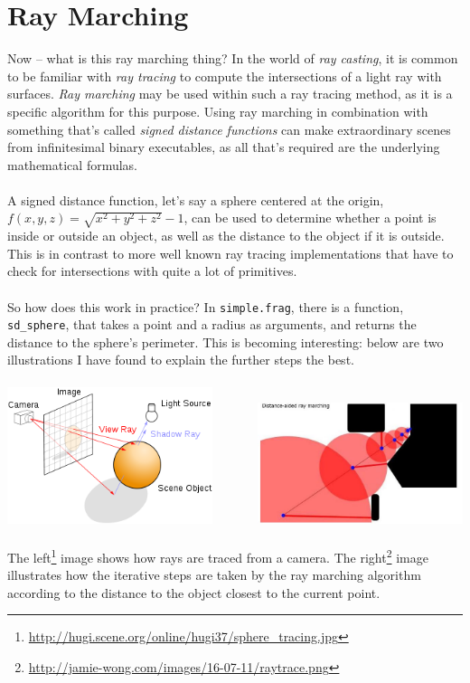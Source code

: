 \documentclass[abstract=off,oneside]{scrreprt}
\begin{document}
\section*{Ray Marching}
\label{sec-3}
Now -- what is this ray marching thing? In the world of \emph{ray casting},
it is common to be familiar with \emph{ray tracing} to compute the
intersections of a light ray with surfaces. \emph{Ray marching} may be used
within such a ray tracing method, as it is a specific algorithm for
this purpose. Using ray marching in combination with something that's
called \emph{signed distance functions} can make extraordinary scenes from
infinitesimal binary executables, as all that's required are the
underlying mathematical formulas.
\\\\
A signed distance function, let's say a sphere centered at the origin,
$f(x, y, z) = \sqrt{x^2 + y^2 + z^2} - 1$, can be used to determine
whether a point is inside or outside an object, as well as the
distance to the object if it is outside. This is in contrast to more
well known ray tracing implementations that have to check for
intersections with quite a lot of primitives.
\\\\
So how does this work in practice? In \verb~simple.frag~, there is a
function, \verb~sd_sphere~, that takes a point and a radius as arguments,
and returns the distance to the sphere's perimeter. This is becoming
interesting: below are two illustrations I have found to explain the
further steps the best.
\\\\
\includegraphics[width=0.45\textwidth]{./img/raytrace.png}
$\hspace{35pt}$
\includegraphics[width=0.45\textwidth]{./img/sphere_tracing.jpg}
\\\\
The left\footnote{\url{http://hugi.scene.org/online/hugi37/sphere_tracing.jpg}} image shows how rays are traced from a camera. The
right\footnote{\url{http://jamie-wong.com/images/16-07-11/raytrace.png}} image illustrates how the iterative steps are taken by the
ray marching algorithm according to the distance to the object closest
to the current point.
\end{document}
